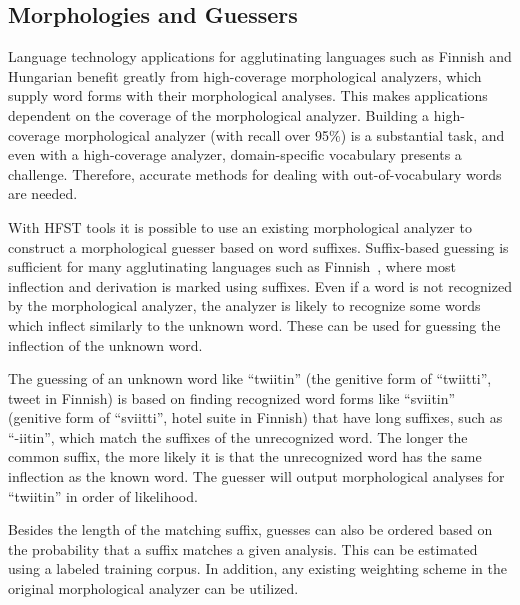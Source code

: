 \documentclass{llncs}
\begin{document}

\subsection{Morphologies and Guessers}
\label{sec: morph-guessers}

Language technology applications for agglutinating languages such as
Finnish and Hungarian benefit greatly from high-coverage morphological
analyzers, which supply word forms with their morphological
analyses. This makes applications dependent on the coverage of the
morphological analyzer. Building a high-coverage morphological
analyzer (with recall over 95\%) is a substantial task, and even with a
high-coverage analyzer, domain-specific vocabulary presents a
challenge. Therefore, accurate methods for dealing with
out-of-vocabulary words are needed.

With HFST tools it is possible to use an existing morphological
analyzer to construct a morphological guesser based on word
suffixes. Suffix-based guessing is sufficient for many agglutinating
languages such as Finnish~\cite{linden/2009/nodalida}, where most
inflection and derivation is marked using suffixes. Even if a word is
not recognized by the morphological analyzer, the analyzer is likely
to recognize some words which inflect similarly to the unknown
word. These can be used for guessing the inflection of the unknown
word.

The guessing of an unknown word like ``twiitin'' (the genitive form of
``twiitti'', tweet in Finnish) is based on finding recognized word
forms like ``sviitin'' (genitive form of ``sviitti'', hotel suite in
Finnish) that have long suffixes, such as ``-iitin'', which match the
suffixes of the unrecognized word. The longer the common suffix, the
more likely it is that the unrecognized word has the same inflection as
the known word. The guesser will output morphological analyses for
``twiitin'' in order of likelihood.

Besides the length of the matching suffix, guesses can also be ordered
based on the probability that a suffix matches a given analysis. This
can be estimated using a labeled training corpus. In addition, any
existing weighting scheme in the original morphological analyzer can
be utilized.
\end{document}
